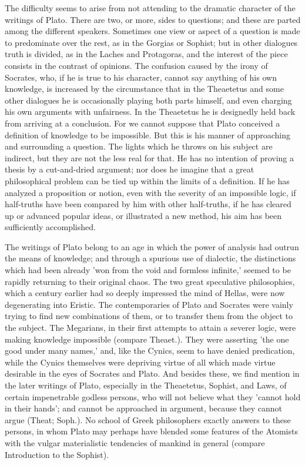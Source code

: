 \documentclass[11pt,letter]{article}
\begin{document}
\par  The difficulty seems to arise from not attending to the dramatic character of the writings of Plato. There are two, or more, sides to questions; and these are parted among the different speakers. Sometimes one view or aspect of a question is made to predominate over the rest, as in the Gorgias or Sophist; but in other dialogues truth is divided, as in the Laches and Protagoras, and the interest of the piece consists in the contrast of opinions. The confusion caused by the irony of Socrates, who, if he is true to his character, cannot say anything of his own knowledge, is increased by the circumstance that in the Theaetetus and some other dialogues he is occasionally playing both parts himself, and even charging his own arguments with unfairness. In the Theaetetus he is designedly held back from arriving at a conclusion. For we cannot suppose that Plato conceived a definition of knowledge to be impossible. But this is his manner of approaching and surrounding a question. The lights which he throws on his subject are indirect, but they are not the less real for that. He has no intention of proving a thesis by a cut-and-dried argument; nor does he imagine that a great philosophical problem can be tied up within the limits of a definition. If he has analyzed a proposition or notion, even with the severity of an impossible logic, if half-truths have been compared by him with other half-truths, if he has cleared up or advanced popular ideas, or illustrated a new method, his aim has been sufficiently accomplished.

\par  The writings of Plato belong to an age in which the power of analysis had outrun the means of knowledge; and through a spurious use of dialectic, the distinctions which had been already 'won from the void and formless infinite,' seemed to be rapidly returning to their original chaos. The two great speculative philosophies, which a century earlier had so deeply impressed the mind of Hellas, were now degenerating into Eristic. The contemporaries of Plato and Socrates were vainly trying to find new combinations of them, or to transfer them from the object to the subject. The Megarians, in their first attempts to attain a severer logic, were making knowledge impossible (compare Theaet.). They were asserting 'the one good under many names,' and, like the Cynics, seem to have denied predication, while the Cynics themselves were depriving virtue of all which made virtue desirable in the eyes of Socrates and Plato. And besides these, we find mention in the later writings of Plato, especially in the Theaetetus, Sophist, and Laws, of certain impenetrable godless persons, who will not believe what they 'cannot hold in their hands'; and cannot be approached in argument, because they cannot argue (Theat; Soph.). No school of Greek philosophers exactly answers to these persons, in whom Plato may perhaps have blended some features of the Atomists with the vulgar materialistic tendencies of mankind in general (compare Introduction to the Sophist).
\end{document}
